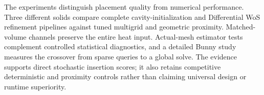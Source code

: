 The experiments distinguish placement quality from numerical performance.
Three different solids compare complete cavity-initialization and Differential
WoS refinement pipelines against tuned multigrid and geometric proximity.
Matched-volume channels preserve the entire heat input. Actual-mesh estimator
tests complement controlled statistical diagnostics, and a detailed Bunny
study measures the crossover from sparse queries to a global solve.
The evidence supports direct stochastic insertion scores; it also retains
competitive deterministic and proximity controls rather than claiming
universal design or runtime superiority.
